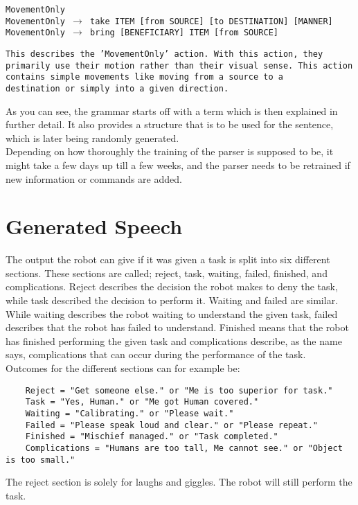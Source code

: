 \documentclass[main.tex]{subfiles}
\begin{document}
		
		\texttt{MovementOnly\\
		MovementOnly $\rightarrow$ take ITEM [from SOURCE] [to DESTINATION] [MANNER]\\
		MovementOnly $\rightarrow$ bring [BENEFICIARY] ITEM [from SOURCE]\\}
		
		\texttt{This describes the 'MovementOnly' action.
		With this action, they primarily use their motion rather than their visual sense. This action contains simple movements like moving from a source to a\\ destination or simply into a given direction.}
		



	As you can see, the grammar starts off with a term which is then explained in further detail. It also provides a structure that is to be used for the sentence, which is later being randomly generated.\\ 
	Depending on how thoroughly the training of the parser is supposed to be, it might take a few days up till a few weeks, and the parser needs to be retrained if new information or commands are added.

	\section{Generated Speech}
	The output the robot can give if it was given a task is split into six different sections. These sections are called; reject, task, waiting, failed, finished, and complications. Reject describes the decision the robot makes to deny the task, while task described the decision to perform it. Waiting and failed are similar. While waiting describes the robot waiting to understand the 
	given task, failed describes that the robot has failed to understand. Finished means that the robot has finished performing the given task and complications describe, as the name says, complications that can occur during the performance of the task.\\ 
	Outcomes for the different sections can for example be:
			
	\begin{verbatim}
	Reject = "Get someone else." or "Me is too superior for task."
	Task = "Yes, Human." or "Me got Human covered."
	Waiting = "Calibrating." or "Please wait."
	Failed = "Please speak loud and clear." or "Please repeat."
	Finished = "Mischief managed." or "Task completed."
	Complications = "Humans are too tall, Me cannot see." or "Object is too small."
	\end{verbatim}
	
	The reject section is solely for laughs and giggles. The robot will still perform the task.
	
\end{document}
